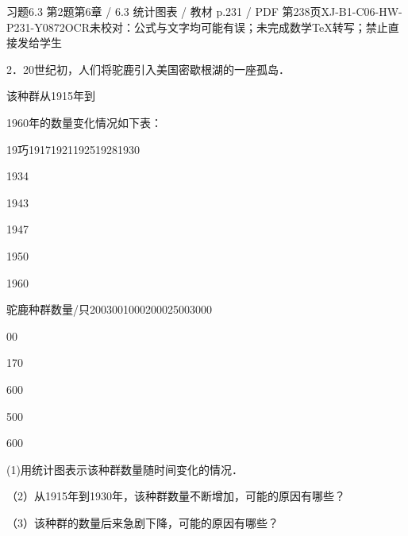 \begin{bankitem}{习题6.3 第2题}{第6章 / 6.3 统计图表 / 教材 p.231 / PDF 第238页}{XJ-B1-C06-HW-P231-Y0872}{OCR未校对：公式与文字均可能有误；未完成数学TeX转写；禁止直接发给学生}
\begin{ocrdraft}
\par
2．20世纪初，人们将驼鹿引入美国密歇根湖的一座孤岛．
\par
该种群从1915年到
\par
1960年的数量变化情况如下表：
\par
19巧19171921192519281930
\par
1934
\par
1943
\par
1947
\par
1950
\par
1960
\par
驼鹿种群数量/只2003001000200025003000
\par
00
\par
170
\par
600
\par
500
\par
600
\par
(1)用统计图表示该种群数量随时间变化的情况．
\par
（2）从1915年到1930年，该种群数量不断增加，可能的原因有哪些？
\par
（3）该种群的数量后来急剧下降，可能的原因有哪些？
\end{ocrdraft}
\end{bankitem}

